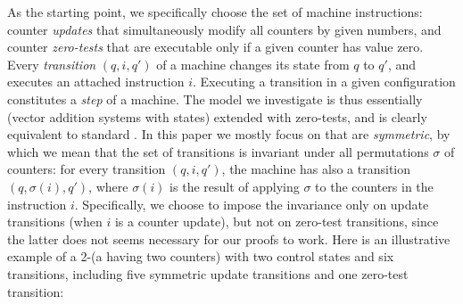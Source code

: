 As the starting point, we specifically choose the set of 
machine instructions:
counter \emph{updates} that simultaneously modify all counters  
by given numbers, and counter \emph{zero-tests} that are 
executable only if a given counter has value zero.
Every \emph{transition} $(q,i,q')$ of a machine changes its state
from $q$ to $q'$,
and executes an attached instruction $i$.
Executing a transition in a given configuration constitutes a 
\emph{step} of a machine.
The model we investigate is thus essentially \vass
(vector addition systems with states) \cite{HopcroftPansiot}
extended with zero-tests, and
is clearly equivalent to standard . %
In this paper we mostly focus on  %
that are 
\emph{symmetric}, by which we mean that the set of transitions
is invariant under all permutations $\sigma$ of counters:
for every transition $(q,i,q')$, the machine has also a transition
$(q,\sigma(i), q')$, where $\sigma(i)$ is the result of 
applying $\sigma$ to the counters in the instruction $i$.
Specifically, we choose to impose the invariance only on update transitions
(when $i$ is a counter update), but
not on zero-test transitions, since the latter does not seems
necessary for our proofs to work.
Here is an illustrative example of a 2-\cm (a \cm having two counters)
with
two control states and
six transitions, including five symmetric update transitions
and one zero-test transition:
\begin{center}
\scalebox{0.7}
{}
\end{center}
\label{fig:example}


